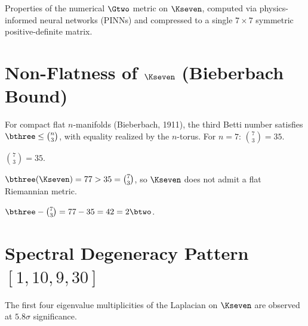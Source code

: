 Properties of the numerical $\Gtwo$ metric on $\Kseven$, computed via
physics-informed neural networks (PINNs) and compressed to a single
$7 \times 7$ symmetric positive-definite matrix.

\section{Non-Flatness of \texorpdfstring{$\Kseven$}{K7} (Bieberbach Bound)}

\begin{definition}\label{def:bieberbach_bound}
    \leanok
    For compact flat $n$-manifolds (Bieberbach, 1911), the third Betti number
    satisfies $\bthree \leq \binom{n}{3}$, with equality realized by the $n$-torus.
    For $n = 7$: $\binom{7}{3} = 35$.
\end{definition}

\begin{theorem}\label{thm:bieberbach_binomial}
    \leanok
    $\binom{7}{3} = 35$.
\end{theorem}

\begin{theorem}\label{thm:K7_nonflatness}
    \leanok
    $\bthree(\Kseven) = 77 > 35 = \binom{7}{3}$, so $\Kseven$ does not admit
    a flat Riemannian metric.
\end{theorem}

\begin{theorem}\label{thm:bieberbach_gap}
    \leanok
    $\bthree - \binom{7}{3} = 77 - 35 = 42 = 2\btwo$.
\end{theorem}

\section{Spectral Degeneracy Pattern \texorpdfstring{$[1, 10, 9, 30]$}{[1, 10, 9, 30]}}

The first four eigenvalue multiplicities of the Laplacian on $\Kseven$
are observed at $5.8\sigma$ significance.

